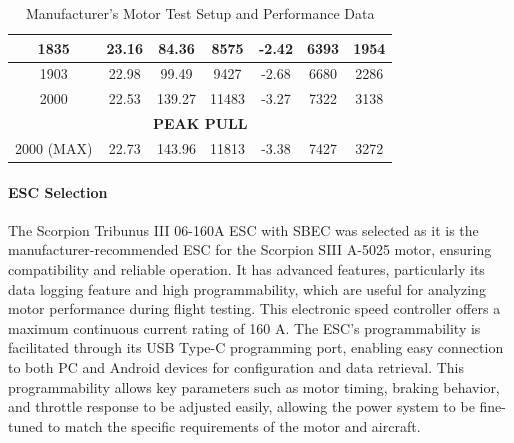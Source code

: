 \documentclass[10pt, letterpaper]{article}
\begin{document}
\begin{table}[H]
\begin{minipage}[c]{0.72\textwidth}
{\begin{tabular}{|>{}c|c|c|c|c|c|c|}
{1835} & 23.16 & 84.36 & 8575 & -2.42 & 6393 & 1954 \\ \hline
{1903} & 22.98 & 99.49 & 9427 & -2.68 & 6680 & 2286 \\ \hline
{2000} & 22.53 & 139.27 & 11483 & -3.27 & 7322 & 3138 \\ \hline
\multicolumn{7}{|c|}{\cellcolor{y}\textbf{PEAK PULL}} \\ \hline
{2000 (MAX)} & {22.73} & {143.96} & {11813} & {-3.38} & {7427} & {3272} \\ \hline
\end{tabular}
}
\end{minipage}

\caption{Manufacturer's Motor Test Setup and Performance Data}
\label{tab:motor_data}
\end{table}


\paragraph{ESC Selection}
The Scorpion Tribunus III 06-160A ESC with SBEC was selected as it is the manufacturer-recommended ESC for the Scorpion SIII A-5025 motor, ensuring compatibility and reliable operation. It has advanced features, particularly its data logging feature and high programmability, which are useful for analyzing motor performance during flight testing. This electronic speed controller offers a maximum continuous current rating of 160 A. The ESC’s programmability is facilitated through its USB Type-C programming port, enabling easy connection to both PC and Android devices for configuration and data retrieval. This programmability allows key parameters such as motor timing, braking behavior, and throttle response to be adjusted easily, allowing the power system to be fine-tuned to match the specific requirements of the motor and aircraft.
\end{document}
